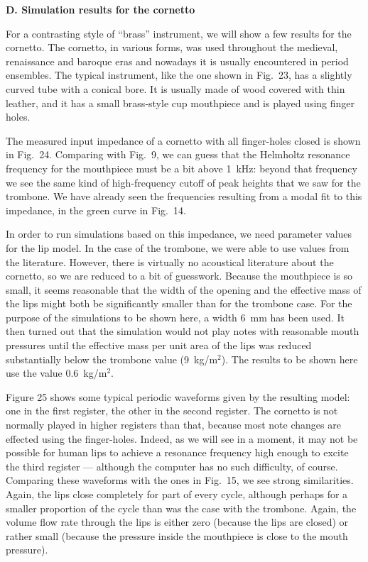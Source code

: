   \textbf{D. Simulation results for the cornetto} 

  For a contrasting style of “brass” instrument, we will show a few results for 
  the cornetto. The cornetto, in various forms, was used throughout the 
  medieval, renaissance and baroque eras and nowadays it is usually encountered 
  in period ensembles. The typical instrument, like the one shown in Fig.\ 23, 
  has a slightly curved tube with a conical bore. It is usually made of wood 
  covered with thin leather, and it has a small brass-style cup mouthpiece and 
  is played using finger holes. 


  The measured input impedance of a cornetto with all finger-holes closed is 
  shown in Fig.\ 24. Comparing with Fig.\ 9, we can guess that the Helmholtz 
  resonance frequency for the mouthpiece must be a bit above 1~kHz: beyond that 
  frequency we see the same kind of high-frequency cutoff of peak heights that 
  we saw for the trombone. We have already seen the frequencies resulting from 
  a modal fit to this impedance, in the green curve in Fig.\ 14. 


  In order to run simulations based on this impedance, we need parameter values 
  for the lip model. In the case of the trombone, we were able to use values 
  from the literature. However, there is virtually no acoustical literature 
  about the cornetto, so we are reduced to a bit of guesswork. Because the 
  mouthpiece is so small, it seems reasonable that the width of the opening and 
  the effective mass of the lips might both be significantly smaller than for 
  the trombone case. For the purpose of the simulations to be shown here, a 
  width 6~mm has been used. It then turned out that the simulation would not 
  play notes with reasonable mouth pressures until the effective mass per unit 
  area of the lips was reduced substantially below the trombone value 
  (9~kg/m$^2$). The results to be shown here use the value 0.6~kg/m$^2$. 

  Figure 25 shows some typical periodic waveforms given by the resulting model: 
  one in the first register, the other in the second register. The cornetto is 
  not normally played in higher registers than that, because most note changes 
  are effected using the finger-holes. Indeed, as we will see in a moment, it 
  may not be possible for human lips to achieve a resonance frequency high 
  enough to excite the third register — although the computer has no such 
  difficulty, of course. Comparing these waveforms with the ones in Fig.\ 15, 
  we see strong similarities. Again, the lips close completely for part of 
  every cycle, although perhaps for a smaller proportion of the cycle than was 
  the case with the trombone. Again, the volume flow rate through the lips is 
  either zero (because the lips are closed) or rather small (because the 
  pressure inside the mouthpiece is close to the mouth pressure). 

